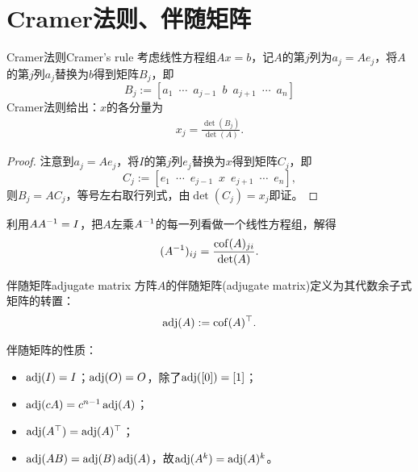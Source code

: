 \section{Cramer法则、伴随矩阵}
\begin{theorem}{Cramer法则}{Cramer's rule}
	考虑线性方程组$Ax=b$，记$A$的第$j$列为$a_j=Ae_j$，将$A$的第$j$列$a_j$替换为$b$得到矩阵$B_j$，即
	\[
		B_j:=[a_1\enspace\cdots\enspace a_{j-1}\enspace b\enspace a_{j+1}\enspace\cdots\enspace a_n]
	\]
	Cramer法则给出：$x$的各分量为
	\begin{align}
		x_j=\frac{\det(B_j)}{\det(A)}.
	\end{align}
\end{theorem}

\begin{proof}
	注意到$a_j=Ae_j$，将$I$的第$j$列$e_j$替换为$x$得到矩阵$C_j$，即
	\[
		C_j:=[e_1\enspace\cdots\enspace e_{j-1}\enspace x\enspace e_{j+1}\enspace\cdots\enspace e_n],
	\]
	则$B_j=AC_j$，等号左右取行列式，由$\det(C_j)=x_j$即证。
\end{proof}

\begin{corollary}
	利用$AA^{-1}=I$，把$A$左乘$A^{-1}$的每一列看做一个线性方程组，解得
	\[
		(A^{-1})_{ij}=\frac{\operatorname{cof}(A)_{ji}}{\det(A)}.
	\]
\end{corollary}
\begin{definition}{伴随矩阵}{adjugate matrix}
	方阵$A$的伴随矩阵(adjugate matrix)定义为其代数余子式矩阵的转置：
	\begin{align}
		\operatorname{adj}(A):=\operatorname{cof}(A)^\top.
	\end{align}
\end{definition}

\begin{corollary}
	伴随矩阵的性质：
	\begin{itemize}
		\item $\operatorname{adj}(I)=I$；$\operatorname{adj}(O)=O$，除了$\operatorname{adj}([0])=[1]$；
		\item $\operatorname{adj}(cA)=c^{n-1}\operatorname{adj}(A)$；
		\item $\operatorname{adj}(A^\top)=\operatorname{adj}(A)^\top$；
		\item $\operatorname{adj}(AB)=\operatorname{adj}(B)\operatorname{adj}(A)$，故$\operatorname{adj}(A^k)=\operatorname{adj}(A)^k$。
	\end{itemize}
\end{corollary}


